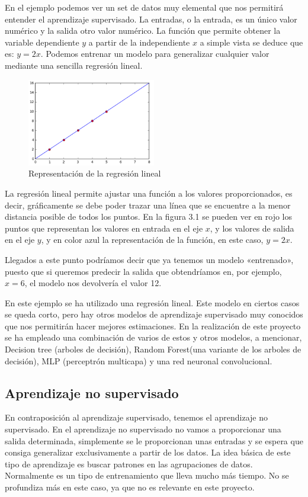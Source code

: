 En el ejemplo podemos ver un set de datos muy elemental que nos permitirá entender el aprendizaje supervisado. La entradas, o la entrada, es un único valor numérico y la salida otro valor numérico. La función que permite obtener la variable dependiente $y$ a partir de la independiente $x$ a simple vista se deduce que es: $y = 2x$. Podemos entrenar un modelo para generalizar cualquier valor mediante una sencilla regresión lineal.

\begin{figure}[h]
  \centering
    \includegraphics[width=0.5\textwidth]{../img/supervisado_grafica_1}
  \caption{Representación de la regresión lineal}
  \label{regresion_lineal}
\end{figure}

La regresión lineal permite ajustar una función a los valores proporcionados, es decir, gráficamente se debe poder trazar una línea que se encuentre a la menor distancia posible de todos los puntos. En la figura 3.1 se pueden ver en rojo los puntos que representan los valores en entrada en el eje $x$, y los valores de salida en el eje $y$, y en color azul la representación de la función, en este caso, $y = 2x$.

Llegados a este punto podríamos decir que ya tenemos un modelo «entrenado», puesto que si queremos predecir la salida que obtendríamos en, por ejemplo, $x=6$, el modelo nos devolvería el valor 12.

En este ejemplo se ha utilizado una regresión lineal. Este modelo en ciertos casos se queda corto, pero hay otros modelos de aprendizaje supervisado muy conocidos que nos permitirán hacer mejores estimaciones. En la realización de este proyecto se ha empleado una combinación de varios de estos y otros modelos, a mencionar, Decision tree (arboles de decisión), Random Forest(una variante de los arboles de decisión), MLP (perceptrón multicapa) y una red neuronal convolucional.

\subsection{Aprendizaje no supervisado}
En contraposición al aprendizaje supervisado, tenemos el aprendizaje no supervisado. En el aprendizaje no supervisado no vamos a proporcionar una salida determinada, simplemente se le proporcionan unas entradas y se espera que consiga generalizar exclusivamente a partir de los datos. La idea básica de este tipo de aprendizaje es buscar patrones en las agrupaciones de datos. Normalmente es un tipo de entrenamiento que lleva mucho más tiempo. No se profundiza más en este caso, ya que no es relevante en este proyecto.

